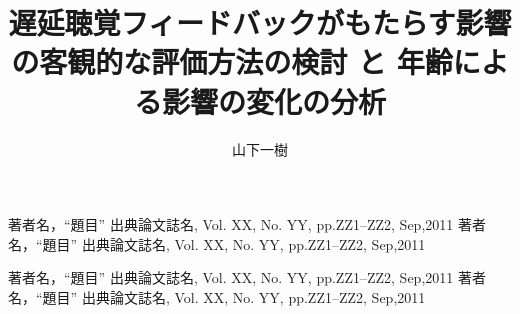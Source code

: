 \documentclass[a4paper,12pt]{jsreport}
\title{遅延聴覚フィードバックがもたらす影響の客観的な評価方法の検討
と
年齢による影響の変化の分析}
\author{山下\hspace{1zw}一樹}%
\begin{document}
\makecover%
\tableofcontents%










\begin{thebibliography}{99}
	著者名，``題目'' 出典論文誌名, Vol. XX, No. YY, pp.ZZ1--ZZ2, Sep,2011
	著者名，``題目'' 出典論文誌名, Vol. XX, No. YY, pp.ZZ1--ZZ2, Sep,2011
\end{thebibliography}
\begin{thepublished}{99}
	著者名，``題目'' 出典論文誌名, Vol. XX, No. YY, pp.ZZ1--ZZ2, Sep,2011
	著者名，``題目'' 出典論文誌名, Vol. XX, No. YY, pp.ZZ1--ZZ2, Sep,2011
\end{thepublished}
\newpage



\appendix

\end{document}
